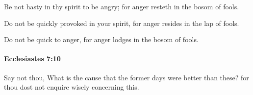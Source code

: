 			\begin{versebox}
					\item[BHS] 
					\item[LXX] 
					\item[ASV] Be not hasty in thy spirit to be angry; for anger resteth in the bosom of fools.
					\item[NIV] Do not be quickly provoked in your spirit, for anger resides in the lap of fools.
					\item[NRSV] Do not be quick to anger, for anger lodges in the bosom of fools.
			\end{versebox}

		\paragraph{Ecclesiastes 7:10} %
			\label{ECCLESIASTES-7-10}

			Say not thou, What is the cause that the former days were better than these? for thou dost not enquire wisely concerning this.

